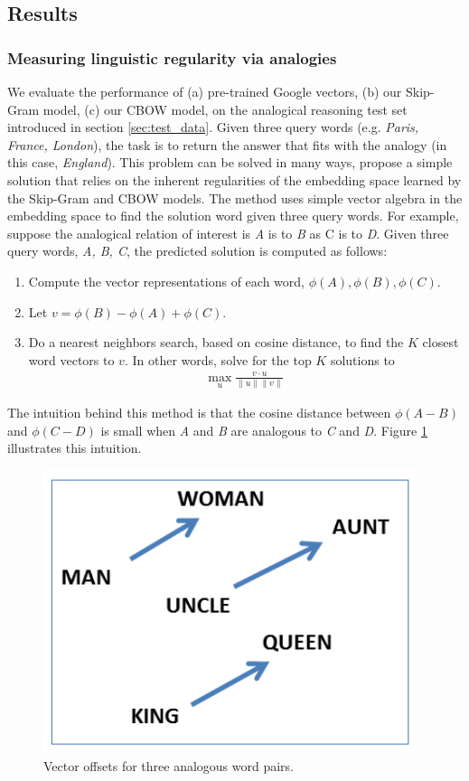 \subsection{Results}

\subsubsection{Measuring linguistic regularity via analogies}
We evaluate the performance of (a) pre-trained Google vectors, (b) our Skip-Gram model, (c) our CBOW model, on the analogical reasoning test set introduced in section \ref{sec:test_data}. Given three query words (e.g. {\it Paris, France, London}), the task is to return the answer that fits with the analogy (in this case, {\it England}). This problem can be solved in many ways, \cite{mikolov1} propose a simple solution that relies on the inherent regularities of the embedding space learned by the Skip-Gram and CBOW models. The method uses simple vector algebra in the embedding space to find the solution word given three query words. For example, suppose the analogical relation of interest is {\it A} is to {\it B} as {\it} C is to {\it D}. Given three query words, {\it A, B, C}, the predicted solution is computed as follows:
\begin{enumerate}
\item Compute the vector representations of each word, $\phi(A), \phi(B), \phi(C)$.
\item Let $v = \phi(B) - \phi(A) + \phi(C)$.
\item Do a nearest neighbors search, based on cosine distance, to find the $K$ closest word vectors to $v$. In other words, solve for the top $K$ solutions to 
	\begin{align} \max_u\frac{ v \cdot u}{\| u \| \| v \|}\ \end{align}
\end{enumerate}

The intuition behind this method is that the cosine distance between $\phi(A - B)$ and $\phi(C - D)$ is small when {\it A} and {\it B} are analogous to {\it C} and {\it D}. Figure \ref{fig:offsets} illustrates this intuition. 

\begin{figure}[h]
\centering
\includegraphics[width=.45\textwidth]{./images/king_queen.png}
\caption{Vector offsets for three analogous word pairs.}
\label{fig:offsets}
\end{figure}

